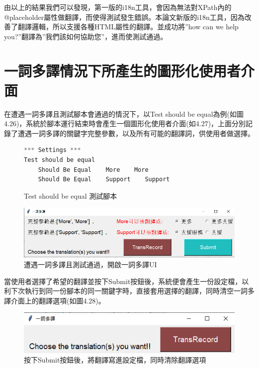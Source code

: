 由以上的結果我們可以發現，第一版的i18n工具，會因為無法對XPath內的@placeholder屬性做翻譯，而使得測試發生錯誤。本論文新版的i18n工具，因為改善了翻譯邏輯，所以支援各種HTML屬性的翻譯。並成功將”how can we help you?”翻譯為”我們該如何協助您”，進而使測試通過。

\section{一詞多譯情況下所產生的圖形化使用者介面}
在遭遇一詞多譯且測試腳本會通過的情況下，以Test should be equal為例(如圖4.26)，系統於腳本運行結束時會產生一個圖形化使用者介面(如4.27)，上面分別記錄了遭遇一詞多譯的關鍵字完整參數，以及所有可能的翻譯詞，供使用者做選擇。\\

\begin{figure}[H]
\begin{lstlisting}[language={python}]
*** Settings ***
Test should be equal
    Should Be Equal    More    More
    Should Be Equal    Support    Support
\end{lstlisting}
\caption{Test should be equal 測試腳本}
\end{figure}

\begin{figure}[H]
\includegraphics[width= \textwidth]{../論文截圖/4-3-2 測試通過且有一詞多譯時，UI會跳出.png}
\caption{遭遇一詞多譯且測試通過，開啟一詞多譯UI}
\end{figure}

當使用者選擇了希望的翻譯並按下Submit按鈕後，系統便會產生一份設定檔，以利下次執行到同一份腳本的同一關鍵字時，直接套用選擇的翻譯，同時清空一詞多譯介面上的翻譯選項(如圖4.28)。

\begin{figure}[H]
\includegraphics[width= \textwidth]{../論文截圖/4-3-3 選擇翻譯後，清空選項.png}
\caption{按下Submit按鈕後，將翻譯寫進設定檔，同時清除翻譯選項}
\end{figure}

